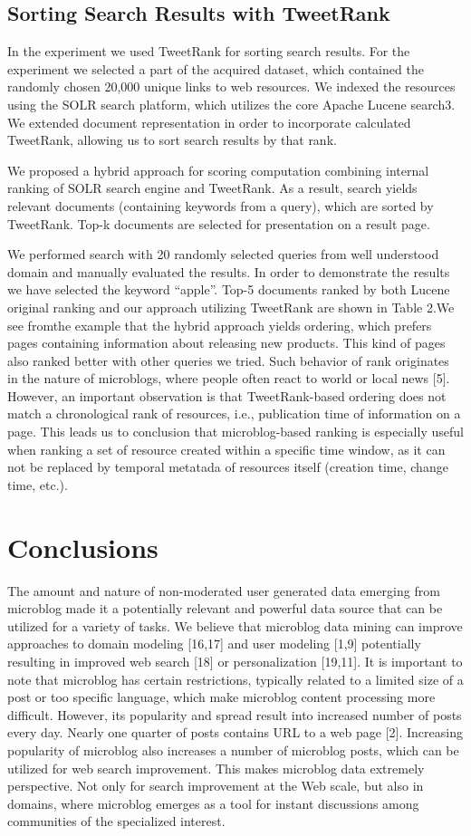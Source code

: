 \documentclass[]{article}
\begin{document}
\subsection {Sorting Search Results with TweetRank}
In the experiment we used TweetRank for sorting search results. For the experiment
we selected a part of the acquired dataset, which contained the randomly
chosen 20,000 unique links to web resources. We indexed the resources using the
SOLR search platform, which utilizes the core Apache Lucene search3. We extended
document representation in order to incorporate calculated TweetRank,
allowing us to sort search results by that rank.

We proposed a hybrid approach for scoring computation combining internal
ranking of SOLR search engine and TweetRank. As a result, search yields
relevant documents (containing keywords from a query), which are sorted by
TweetRank. Top-k documents are selected for presentation on a result page.

We performed search with 20 randomly selected queries from well understood
domain and manually evaluated the results. In order to demonstrate the results
we have selected the keyword “apple”. Top-5 documents ranked by both Lucene
original ranking and our approach utilizing TweetRank are shown in Table 2.We
see fromthe example that the hybrid approach yields ordering, which prefers pages
containing information about releasing new products. This kind of pages also
ranked better with other queries we tried. Such behavior of rank originates in the
nature of microblogs, where people often react to world or local news [5]. However,
an important observation is that TweetRank-based ordering does not match
a chronological rank of resources, i.e., publication time of information on a page.
This leads us to conclusion that microblog-based ranking is especially useful when
ranking a set of resource created within a specific time window, as it can not be replaced
by temporal metatada of resources itself (creation time, change time, etc.).

\section {Conclusions}
The amount and nature of non-moderated user generated data emerging from
microblog made it a potentially relevant and powerful data source that can be
utilized for a variety of tasks. We believe that microblog data mining can improve
approaches to domain modeling [16,17] and user modeling [1,9] potentially
resulting in improved web search [18] or personalization [19,11]. It is important
to note that microblog has certain restrictions, typically related to a limited
size of a post or too specific language, which make microblog content processing
more difficult. However, its popularity and spread result into increased number
of posts every day. Nearly one quarter of posts contains URL to a web page [2].
Increasing popularity of microblog also increases a number of microblog posts,
which can be utilized for web search improvement. This makes microblog data
extremely perspective. Not only for search improvement at the Web scale, but
also in domains, where microblog emerges as a tool for instant discussions among
communities of the specialized interest.
\end{document}
